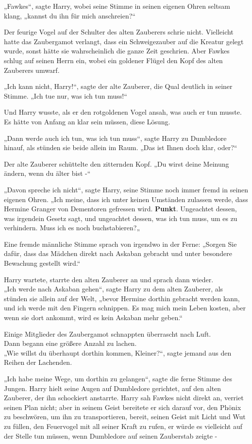 {„Fawkes“, sagte Harry, wobei seine Stimme in seinen eigenen Ohren seltsam klang, „kannst du ihn für mich anschreien?“

Der feurige Vogel auf der Schulter des alten Zauberers schrie nicht. Vielleicht hatte das Zaubergamot verlangt, dass ein Schweigezauber auf die Kreatur gelegt wurde, sonst hätte sie wahrscheinlich die ganze Zeit geschrien. Aber Fawkes schlug auf seinen Herrn ein, wobei ein goldener Flügel den Kopf des alten Zauberers umwarf.

„Ich kann nicht, Harry!“, sagte der alte Zauberer, die Qual deutlich in seiner Stimme. „Ich tue nur, was ich tun muss!“

Und Harry wusste, als er den rotgoldenen Vogel ansah, was auch er tun musste. Es hätte von Anfang an klar sein müssen, diese Lösung.

„Dann werde auch ich tun, was ich tun muss“, sagte Harry zu Dumbledore hinauf, als stünden sie beide allein im Raum. „Das ist Ihnen doch klar, oder?“

Der alte Zauberer schüttelte den zitternden Kopf. „Du wirst deine Meinung ändern, wenn du älter bist -“

„Davon spreche ich nicht“, sagte Harry, seine Stimme noch immer fremd in seinen eigenen Ohren. „Ich meine, dass ich unter keinen Umständen zulassen werde, dass Hermine Granger von Dementoren gefressen wird. \textbf{Punkt}. Ungeachtet dessen, was irgendein Gesetz sagt, und ungeachtet dessen, was ich tun muss, um es zu verhindern. Muss ich es noch buchstabieren?„

Eine fremde männliche Stimme sprach von irgendwo in der Ferne: „Sorgen Sie dafür, dass das Mädchen direkt nach Askaban gebracht und unter besondere Bewachung gestellt wird.“

Harry wartete, starrte den alten Zauberer an und sprach dann wieder.\\ „Ich werde nach Askaban gehen“, sagte Harry zu dem alten Zauberer, als stünden sie allein auf der Welt, „bevor Hermine dorthin gebracht werden kann, und ich werde mit den Fingern schnippen. Es mag mich mein Leben kosten, aber wenn sie dort ankommt, wird es kein Askaban mehr geben.“

Einige Mitglieder des Zaubergamot schnappten überrascht nach Luft.\\ Dann begann eine größere Anzahl zu lachen.\\ „Wie willst du überhaupt dorthin kommen, Kleiner?“, sagte jemand aus den Reihen der Lachenden.

„Ich habe meine Wege, um dorthin zu gelangen“, sagte die ferne Stimme des Jungen. Harry hielt seine Augen auf Dumbledore gerichtet, auf den alten Zauberer, der ihn schockiert anstarrte. Harry sah Fawkes nicht direkt an, verriet seinen Plan nicht; aber in seinem Geist bereitete er sich darauf vor, den Phönix zu beschwören, um ihn zu transportieren, bereit, seinen Geist mit Licht und Wut zu füllen, den Feuervogel mit all seiner Kraft zu rufen, er würde es vielleicht auf der Stelle tun müssen, wenn Dumbledore auf seinen Zauberstab zeigte -

}
